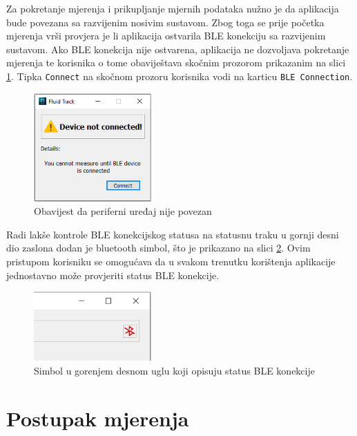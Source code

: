 \documentclass[../diplomski_rad.tex]{subfiles}
\begin{document}
Za pokretanje mjerenja i prikupljanje mjernih podataka nužno je da aplikacija bude povezana sa razvijenim nosivim sustavom. 
Zbog toga se prije početka mjerenja vrši provjera je li aplikacija ostvarila BLE konekciju sa razvijenim sustavom. 
Ako BLE konekcija nije ostvarena, aplikacija ne dozvoljava pokretanje mjerenja te korisnika o tome obaviještava 
skočnim prozorom prikazanim na slici \ref{slk:ble_not_connected}. Tipka \texttt{Connect} na skočnom prozoru korisnika 
vodi na karticu \texttt{BLE Connection}.

\begin{figure}[htb]
    \centering
    \includegraphics[width=0.4\textwidth]{Figures/ble_not_connected.png} 
    \caption{Obavijest da periferni uređaj nije povezan}
    \label{slk:ble_not_connected}
\end{figure}

Radi lakše kontrole BLE konekcijskog statusa na statusnu traku u gornji desni dio zaslona dodan je bluetooth simbol, 
što je prikazano na slici \ref{slk:ble_status}.  
Ovim pristupom korisniku se omogućava da u svakom trenutku korištenja aplikacije jednostavno može provjeriti status BLE konekcije. 

\begin{figure}[htb]
    \centering
    \includegraphics[width=0.4\textwidth]{Figures/cosak.png} 
    \caption{Simbol u gorenjem desnom uglu koji opisuju status BLE konekcije}
    \label{slk:ble_status}
\end{figure}

\section{Postupak mjerenja}
\end{document}
